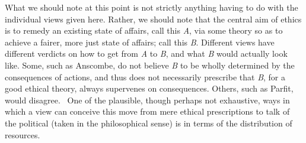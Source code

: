 What we should note at this point is not strictly anything having to do with the individual views given here. Rather, we should note that the central aim of ethics is to remedy an existing state of affairs, call this \emph{A}, via some theory so as to achieve a fairer, more just state of affairs; call this \emph{B}. Different views have different verdicts on how to get from \emph{A} to \emph{B}, and what \emph{B} would actually look like. Some, such as Anscombe, do not believe \emph{B} to be wholly determined by the consequences of actions, and thus does not necessarily prescribe that \emph{B}, for a good ethical theory, always supervenes on consequences. Others, such as Parfit, would disagree.~\citep{Parfit(1984)} One of the plausible, though perhaps not exhaustive, ways in which a view can conceive this move from mere ethical prescriptions to talk of the political (taken in the philosophical sense) is in terms of the distribution of resources.

